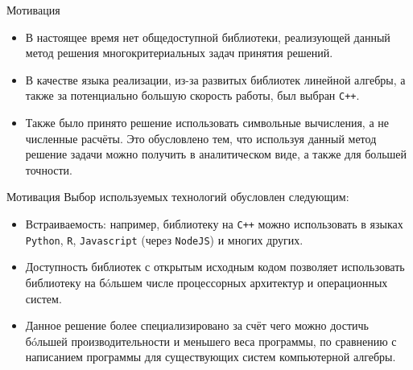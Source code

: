 \documentclass[11pt]{beamer}
\begin{document}

\begin{frame}{Мотивация}
	\begin{itemize}
	\item В настоящее время нет общедоступной библиотеки, реализующей данный метод решения многокритериальных задач принятия решений.
	
	\item В качестве языка реализации, из-за развитых библиотек линейной алгебры, а также за потенциально большую скорость работы, был выбран \texttt{C++}.
	
	\item Также было принято решение использовать символьные вычисления, а не численные расчёты. Это обусловлено тем, что используя данный метод решение задачи можно получить в аналитическом виде, а также для большей точности.
	\end{itemize}
\end{frame}

\begin{frame}{Мотивация}
  Выбор используемых технологий обусловлен следующим:
	\begin{itemize}
    \item Встраиваемость: например, библиотеку на \texttt{C++} можно использовать в языках \texttt{Python}, \texttt{R}, \texttt{Javascript} (через \texttt{NodeJS}) и многих других.
    \item Доступность библиотек с открытым исходным кодом позволяет использовать библиотеку на бóльшем числе процессорных архитектур и операционных систем.
    \item Данное решение более специализировано за счёт чего можно достичь бóльшей производительности и меньшего веса программы, по сравнению с написанием программы для существующих систем компьютерной алгебры.
	\end{itemize}
\end{frame}
\end{document}
